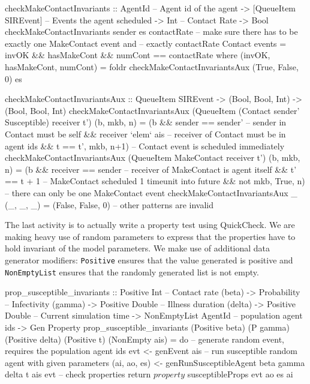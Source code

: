 \begin{HaskellCode}
checkMakeContactInvariants :: AgentId              -- Agent id of the agent 
                           -> [QueueItem SIREvent] -- Events the agent scheduled
                           -> Int                  -- Contact Rate
                           -> Bool
checkMakeContactInvariants sender es contactRate
    -- make sure there has to be exactly one MakeContact event and
    -- exactly contactRate Contact events
    = invOK && hasMakeCont && numCont == contactRate
  where
    (invOK, hasMakeCont, numCont) 
      = foldr checkMakeContactInvariantsAux (True, False, 0) es

    checkMakeContactInvariantsAux :: QueueItem SIREvent 
                                  -> (Bool, Bool, Int)
                                  -> (Bool, Bool, Int)
    checkMakeContactInvariantsAux 
        (QueueItem (Contact sender' Susceptible) receiver t') (b, mkb, n)
      = (b && sender == sender'   -- sender in Contact must be self
           && receiver `elem` ais -- receiver of Contact must be in agent ids
           && t == t', mkb, n+1)  -- Contact event is scheduled immediately
    checkMakeContactInvariantsAux 
        (QueueItem MakeContact receiver t') (b, mkb, n) 
      = (b && receiver == sender  -- receiver of MakeContact is agent itself
           && t' == t + 1         -- MakeContact scheduled 1 timeunit into future
           &&  not mkb, True, n)  -- there can only be one MakeContact event
    checkMakeContactInvariantsAux _ (_, _, _) 
      = (False, False, 0)         -- other patterns are invalid
\end{HaskellCode}

The last activity is to actually write a property test using QuickCheck. We are making heavy use of random parameters to express that the properties have to hold invariant of the model parameters. We make use of additional data generator modifiers: \texttt{Positive} ensures that the value generated is positive and \texttt{NonEmptyList} ensures that the randomly generated list is not empty.

\begin{HaskellCode}
prop_susceptible_invariants :: Positive Int         -- Contact rate (beta)
                            -> Probability          -- Infectivity (gamma)
                            -> Positive Double      -- Illness duration (delta)
                            -> Positive Double      -- Current simulation time
                            -> NonEmptyList AgentId -- population agent ids
                            -> Gen Property
prop_susceptible_invariants 
  (Positive beta) (P gamma) (Positive delta) (Positive t) (NonEmpty ais) = do
  -- generate random event, requires the population agent ids
  evt <- genEvent ais
  -- run susceptible random agent with given parameters
  (ai, ao, es) <- genRunSusceptibleAgent beta gamma delta t ais evt
  -- check properties
  return $ property $ susceptibleProps evt ao es ai
\end{HaskellCode}

